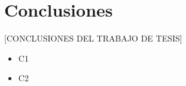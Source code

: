 \chapter*{Conclusiones}

[CONCLUSIONES DEL TRABAJO DE TESIS]


\begin{itemize}
\item C1
\item C2
\end{itemize}



